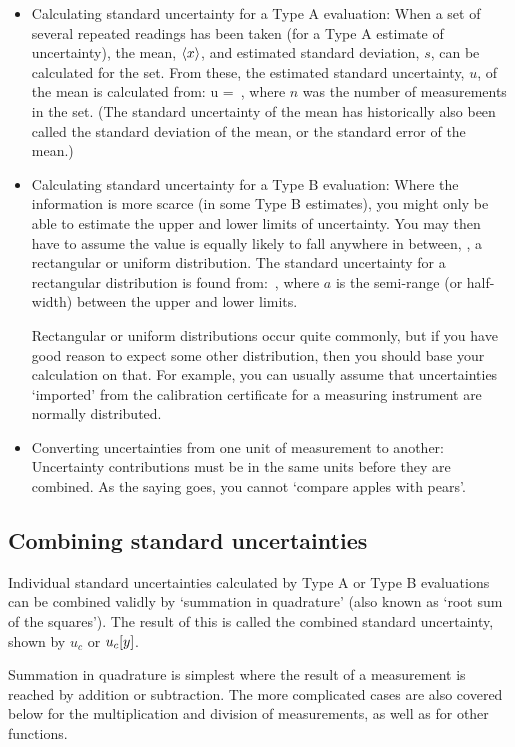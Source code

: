 \begin{itemize}
\item Calculating standard uncertainty for a Type A evaluation: When a set of several repeated readings has been taken (for a Type A estimate of uncertainty), the mean, $\left\langle{x}\right\rangle$, and estimated standard deviation, $s$, can be calculated for the set. From these, the estimated standard uncertainty, $u$, of the mean is calculated from:
\beq
u = \,,
\eeq
where $n$ was the number of measurements in the set. (The standard uncertainty of the mean has historically also been called the standard deviation of the mean, or the standard error of the mean.)


\item Calculating standard uncertainty for a Type B evaluation: Where the information is more scarce (in some Type B estimates), you might only be able to estimate the upper and lower limits of uncertainty. You may then have to assume the value is equally likely to fall anywhere in between, \ie, a rectangular or uniform distribution. The standard uncertainty for a rectangular distribution is found from:
\beq
{}\,,
\eeq
where $a$ is the semi-range (or half-width) between the upper and lower limits.

Rectangular or uniform distributions occur quite commonly, but if you have good reason to expect some other distribution, then you should base your calculation on that. For example, you can usually assume that uncertainties `imported' from the calibration certificate for a measuring instrument are normally distributed.


\item Converting uncertainties from one unit of measurement to another: Uncertainty contributions must be in the same units before they are combined. As the saying goes, you cannot `compare apples with pears'.
\end{itemize}


\subsection{Combining standard uncertainties}
Individual standard uncertainties calculated by Type A or Type B evaluations can be combined validly by `summation in quadrature' (also known as `root sum of the squares'). The result of this is called the combined standard uncertainty, shown by $u_c$ or $u_c\!\left[{y}\right]$.

Summation in quadrature is simplest where the result of a measurement is reached by addition or subtraction. The more complicated cases are also covered below for the multiplication and division of measurements, as well as for other functions.


